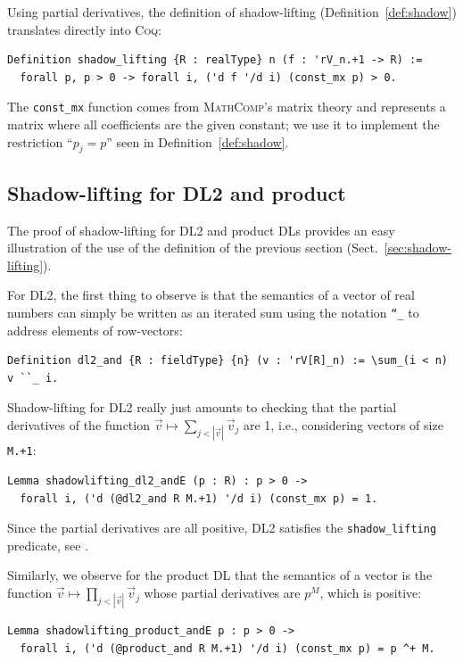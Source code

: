 \documentclass[a4paper,UKenglish,cleveref, autoref, thm-restate]{lipics-v2021}
\def\coqin#1{\texttt{#1}}
\def\DLtwo{\textrm{DL2}}
\def\product{\textrm{product}}
\def\coq{\textsc{Coq}}
\def\mathcomp{\textsc{MathComp}}
\begin{document}
Using partial derivatives, the definition of shadow-lifting (Definition~\ref{def:shadow}) translates directly into \coq:
\begin{verbatim}
Definition shadow_lifting {R : realType} n (f : 'rV_n.+1 -> R) :=
  forall p, p > 0 -> forall i, ('d f '/d i) (const_mx p) > 0.
\end{verbatim}
The \coqin{const_mx} function comes from \mathcomp's matrix theory and represents a matrix where all coefficients are the given constant; we use it to implement the restriction ``$p_j = p$'' seen in Definition~\ref{def:shadow}.

\subsection{Shadow-lifting for \DLtwo{} and \product{}}
\label{sec:sldltwoproduct}

The proof of shadow-lifting for \DLtwo{} and \product{} DLs provides
an easy illustration of the use of the definition of the previous section (Sect.~\ref{sec:shadow-lifting}).

For \DLtwo{}, the first thing to observe is that the semantics of a
vector of real numbers can simply be written as an iterated sum
using the notation \coqin{``_} to address elements of row-vectors:
\begin{verbatim}
Definition dl2_and {R : fieldType} {n} (v : 'rV[R]_n) := \sum_(i < n) v ``_ i.
\end{verbatim}
Shadow-lifting for \DLtwo{} really just amounts to checking that the
partial derivatives of the function
$\vec{v}\mapsto \sum_{j < |\vec{v}|}\vec{v}_j$ are 1, i.e.,
considering vectors of size \coqin{M.+1}:
\begin{verbatim}
Lemma shadowlifting_dl2_andE (p : R) : p > 0 ->
  forall i, ('d (@dl2_and R M.+1) '/d i) (const_mx p) = 1.
\end{verbatim}
Since the partial derivatives are all positive, \DLtwo{} satisfies the
\coqin{shadow_lifting} predicate, see \cite[file \coqin{dl2.v}]{ldl}.

Similarly, we observe for the \product{} DL that the semantics of a vector
is the function $\vec{v}\mapsto \prod_{j < |\vec{v}|}\vec{v}_j$ whose 
partial derivatives are $p^M$, which is positive:
\begin{verbatim}
Lemma shadowlifting_product_andE p : p > 0 ->
  forall i, ('d (@product_and R M.+1) '/d i) (const_mx p) = p ^+ M.
\end{verbatim}
\end{document}
